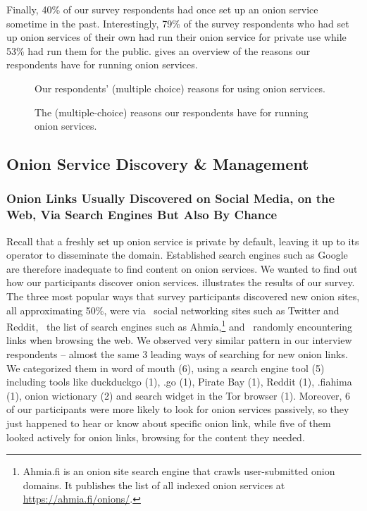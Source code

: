 Finally, 40\% of our survey respondents had once set up an onion service sometime in the past. 
Interestingly, 79\% of the survey respondents who had set up onion services of their own had run their onion service for
private use while 53\% had run them for the public.  gives an overview of the reasons our
respondents have for running onion services. 


\begin{figure}[t]
    \centering
    
    \caption{Our respondents' (multiple choice) reasons for using onion
    services.}
    \label{fig:onion-usage}
\end{figure}



\begin{figure}[t]
    \centering
    
    \caption{The (multiple-choice) reasons our respondents have for running
    onion services.}
    \label{fig:onion-operation-reasons}
\end{figure}

\subsection{Onion Service Discovery \& Management}
\label{sec:manage}

\subsubsection{Onion Links Usually Discovered on Social Media, on the Web, Via Search Engines But Also By Chance}
Recall that a freshly set up onion service is private by default, leaving it up
to its operator to disseminate the domain.  Established search engines such as
Google are therefore inadequate to find content on onion services.  We wanted to
find out how our participants discover onion services.
 illustrates the results of our survey.  The three most popular ways
that survey participants discovered new onion sites, all approximating 50\%, were via \first~social
networking sites such as Twitter and Reddit, \second~the list of search engines
such as Ahmia,\footnote{Ahmia.fi is an onion site search engine that crawls
user-submitted onion domains.  It publishes the list of all indexed onion
services at \url{https://ahmia.fi/onions/}.} and \third~randomly encountering
links when browsing the web. 
We observed very similar pattern in our interview respondents – almost the same 3 leading ways of searching for new onion links.  We categorized them in word of mouth (6), using a search engine tool (5) including tools like duckduckgo (1), .go (1), Pirate Bay (1), Reddit (1), .fiahima (1), onion wictionary (2) and search widget in the Tor browser (1). Moreover, 6 of our participants were more likely to look for onion services passively, so they just happened to hear or know about specific onion link, while five of them looked actively for onion links, browsing for the content they needed.

